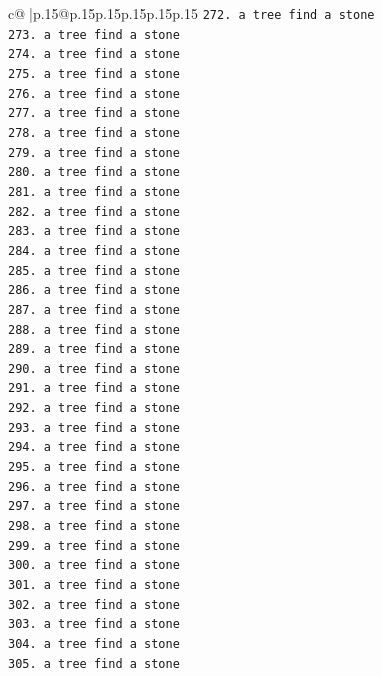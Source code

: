 \documentclass{article}
\begin{document}
{\begin{supertabular}{c@{$\;$}|p{.15\linewidth}@{}p{.15\linewidth}p{.15\linewidth}p{.15\linewidth}p{.15\linewidth}p{.15\linewidth}}
{{{\texttt{272. a tree find a stone} \\
\texttt{273. a tree find a stone} \\
\texttt{274. a tree find a stone} \\
\texttt{275. a tree find a stone} \\
\texttt{276. a tree find a stone} \\
\texttt{277. a tree find a stone} \\
\texttt{278. a tree find a stone} \\
\texttt{279. a tree find a stone} \\
\texttt{280. a tree find a stone} \\
\texttt{281. a tree find a stone} \\
\texttt{282. a tree find a stone} \\
\texttt{283. a tree find a stone} \\
\texttt{284. a tree find a stone} \\
\texttt{285. a tree find a stone} \\
\texttt{286. a tree find a stone} \\
\texttt{287. a tree find a stone} \\
\texttt{288. a tree find a stone} \\
\texttt{289. a tree find a stone} \\
\texttt{290. a tree find a stone} \\
\texttt{291. a tree find a stone} \\
\texttt{292. a tree find a stone} \\
\texttt{293. a tree find a stone} \\
\texttt{294. a tree find a stone} \\
\texttt{295. a tree find a stone} \\
\texttt{296. a tree find a stone} \\
\texttt{297. a tree find a stone} \\
\texttt{298. a tree find a stone} \\
\texttt{299. a tree find a stone} \\
\texttt{300. a tree find a stone} \\
\texttt{301. a tree find a stone} \\
\texttt{302. a tree find a stone} \\
\texttt{303. a tree find a stone} \\
\texttt{304. a tree find a stone} \\
\texttt{305. a tree find a stone} \\
}}}
\end{supertabular}}
\end{document}
